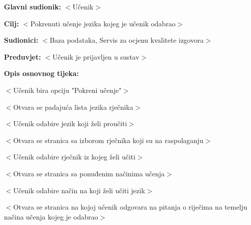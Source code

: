 					\noindent {}
					\begin{packed_item}
	
						\item \textbf{Glavni sudionik: }$<$Učenik$>$
						\item  \textbf{Cilj:} $<$Pokrenuti učenje jezika kojeg je učenik odabrao$>$
						\item  \textbf{Sudionici:} $<$Baza podataka, Servis za ocjenu kvalitete izgovora$>$
						\item  \textbf{Preduvjet:} $<$Učenik je prijavljen u sustav$>$
						\item  \textbf{Opis osnovnog tijeka:}
						
						\item[] \begin{packed_enum}
	
							\item $<$Učenik bira opciju "Pokreni učenje"$>$
							\item $<$Otvara se padajuća lista jezika rječnika$>$
							\item $<$Učenik odabire jezik koji želi proučiti$>$
							\item $<$Otvara se stranica sa izborom rječnika koji su na raspolaganju$>$
							\item $<$Učenik odabire rječnik iz kojeg želi učiti$>$
							\item $<$Otvara se stranica sa ponuđenim načinima učenja$>$
							\item $<$Učenik odabire način na koji želi učiti jezik$>$
							\item $<$Otvara se stranica na kojoj učenik odgovara na pitanja o riječima na temelju načina učenja kojeg je odabrao$>$
						\end{packed_enum}
						
					\end{packed_item}

